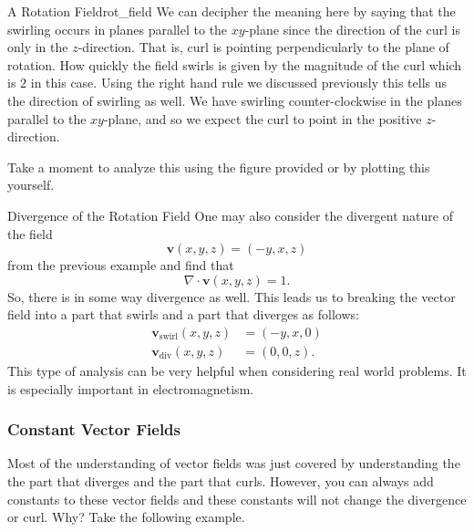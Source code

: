 \begin{ex}{A Rotation Field}{rot_field}
        We can decipher the meaning here by saying that the swirling occurs in planes parallel to the $xy$-plane since the direction of the curl is only in the $z$-direction.  That is, curl is pointing perpendicularly to the plane of rotation.  How quickly the field swirls is given by the magnitude of the curl which is $2$ in this case.  Using the right hand rule we discussed previously this tells us the direction of swirling as well.  We have swirling counter-clockwise in the planes parallel to the $xy$-plane, and so we expect the curl to point in the positive $z$-direction.
        
        Take a moment to analyze this using the figure provided or by plotting this yourself.
        \end{ex}
        
        \begin{ex}{Divergence of the Rotation Field}
        One may also consider the divergent nature of the field 
        \[
        \mathbf{v}(x,y,z) = (-y,x,z)
        \]
        from the previous example and find that 
        \[
        \nabla \cdot \mathbf{v}(x,y,z) = 1.
        \]
        So, there is in some way divergence as well.  This leads us to breaking the vector field into a part that swirls and a part that diverges as follows:
        \begin{align*}
            \mathbf{v}_\textrm{swirl}(x,y,z) &= (-y,x,0)\\
            \mathbf{v}_\textrm{div}(x,y,z) &= (0,0,z).
        \end{align*}
        This type of analysis can be very helpful when considering real world problems.  It is especially important in electromagnetism.
        \end{ex}
        
        \subsubsection{Constant Vector Fields}
        Most of the understanding of vector fields was just covered by understanding the the part that diverges and the part that curls.  However, you can always add constants to these vector fields and these constants will not change the divergence or curl. Why? Take the following example.
        

